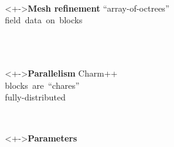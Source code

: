 \begin{frame}[fragile,label=ss-state]
\pause
\begin{center}
\begin{minipage}{4.5in}
\begin{minipage}{2.9in}
\end{minipage} \ 
\begin{minipage}{1.45in}
\end{minipage}
\end{minipage}
\end{center}
\pause
\pause
\begin{minipage}[t]{1.2in}
\footnotesize
\vspace{0.1in}
\blockred
\begin{block}<+->{\textbf{Mesh refinement}}
\scriptsize
 \mbox{``array-of-octrees''} \\
 \mbox{field data on blocks} \\ \ \\
\end{block}
\end{minipage} \ \ 
\begin{minipage}[t]{1.0in}
\footnotesize
\vspace{0.1in}
\blockgreen
\begin{block}<+->{\textbf{Parallelism}}
\scriptsize
 Charm++\\
\mbox{blocks are ``chares''} \\
 \mbox{fully-distributed}
\end{block}
\end{minipage} \ \
\begin{minipage}[t]{1.6in}
\raggedright
\footnotesize
\vspace{0.1in}
\blockblue
\begin{block}<+->{\textbf{Parameters}}
\scriptsize
 \mbox{} \\
 \mbox{\code{ value = [ 1.5, "daze.png",  }} \\
 \mbox{\code{\ \ \ \ \ \ \ \ \ \ \ 0.125 ]; \} \} }}
\end{block}
\end{minipage}

\end{frame}


